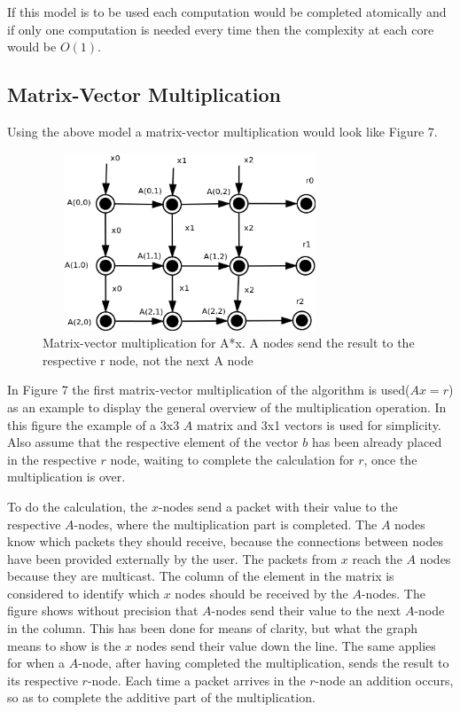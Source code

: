 \documentclass[12pt,a4paper]{article}
\begin{document}
If this model is to be used each computation would be completed atomically and if only one computation is needed every time then the complexity at each core would be $O(1)$.
\subsection{Matrix-Vector Multiplication}
Using the above model a matrix-vector multiplication would look like Figure 7. 
\begin{figure}[h!]
\includegraphics[width=250pt,height=150pt,scale=2]{Pics/mat0mult.png}
\centering
\caption{Matrix-vector multiplication for A*x. A nodes send the result to the respective r node, not the next A node\cite{basicinterim}}
\end{figure}

In Figure 7 the first matrix-vector multiplication of the algorithm is used($Ax=r$) as an example to display the general overview of the multiplication operation. In this figure the example of a 3x3 $A$ matrix and 3x1 vectors is used for simplicity. Also assume that the respective element of the vector $b$ has been already placed in the respective $r$ node, waiting to complete the calculation for $r$, once the multiplication is over. 

To do the calculation, the $x$-nodes send a packet with their value to the respective $A$-nodes, where the multiplication part is completed. The $A$ nodes know which packets they should receive, because the connections between nodes have been provided externally by the user. The packets from $x$ reach the $A$ nodes because they are multicast. The column of the element in the matrix is considered to identify which $x$ nodes should be received by the $A$-nodes. The figure shows without precision that $A$-nodes send their value to the next $A$-node in the column. This has been done for means of clarity, but what the graph means to show is the $x$ nodes send their value down the line. The same applies for when a $A$-node, after having completed the multiplication, sends the result to its respective $r$-node. Each time a packet arrives in the $r$-node an addition occurs, so as to complete the additive part of the multiplication. 
\end{document}
